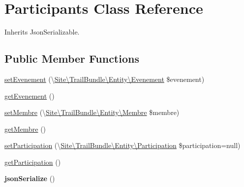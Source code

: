 \hypertarget{class_site_1_1_trail_bundle_1_1_entity_1_1_participants}{}\section{Participants Class Reference}
\label{class_site_1_1_trail_bundle_1_1_entity_1_1_participants}


Inherits Json\+Serializable.

\subsection*{Public Member Functions}
\begin{DoxyCompactItemize}
\item 
\hyperlink{class_site_1_1_trail_bundle_1_1_entity_1_1_participants_a8db4d0c857e263b45a26a9893164ea49}{set\+Evenement} (\textbackslash{}\hyperlink{class_site_1_1_trail_bundle_1_1_entity_1_1_evenement}{Site\textbackslash{}\+Trail\+Bundle\textbackslash{}\+Entity\textbackslash{}\+Evenement} \$evenement)
\item 
\hyperlink{class_site_1_1_trail_bundle_1_1_entity_1_1_participants_a0d200fcb8e70d13b45e20baf2269ed3f}{get\+Evenement} ()
\item 
\hyperlink{class_site_1_1_trail_bundle_1_1_entity_1_1_participants_a5a423d8cd907837df37c87941b8532f9}{set\+Membre} (\textbackslash{}\hyperlink{class_site_1_1_trail_bundle_1_1_entity_1_1_membre}{Site\textbackslash{}\+Trail\+Bundle\textbackslash{}\+Entity\textbackslash{}\+Membre} \$membre)
\item 
\hyperlink{class_site_1_1_trail_bundle_1_1_entity_1_1_participants_adead50e10dd2173eae7e774b19888b76}{get\+Membre} ()
\item 
\hyperlink{class_site_1_1_trail_bundle_1_1_entity_1_1_participants_a121d5f1fe120209df4558e08d96b0eaa}{set\+Participation} (\textbackslash{}\hyperlink{class_site_1_1_trail_bundle_1_1_entity_1_1_participation}{Site\textbackslash{}\+Trail\+Bundle\textbackslash{}\+Entity\textbackslash{}\+Participation} \$participation=null)
\item 
\hyperlink{class_site_1_1_trail_bundle_1_1_entity_1_1_participants_ab1268353a93aa70723c17be73865904e}{get\+Participation} ()
\item 
\hypertarget{class_site_1_1_trail_bundle_1_1_entity_1_1_participants_ad402d8679325bc514874370f02b5c2ac}{}{\bfseries json\+Serialize} ()\label{class_site_1_1_trail_bundle_1_1_entity_1_1_participants_ad402d8679325bc514874370f02b5c2ac}

\end{DoxyCompactItemize}


